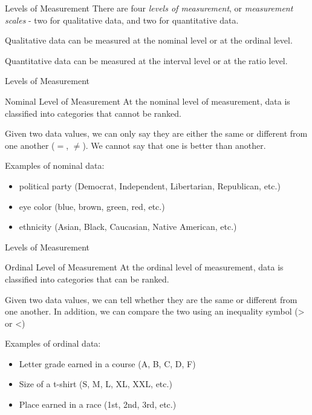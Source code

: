 \documentclass[t]{beamer}
\newcommand{\?}{\stackrel{?}{=}}
\begin{document}
	\begin{frame}{Levels of Measurement}
		There are four \textit{levels of measurement}, or \textit{measurement scales} - two for qualitative data, and two for quantitative data. \pause
		
		Qualitative data can be measured at the nominal level or at the ordinal level. \pause
		
		Quantitative data can be measured at the interval level or at the ratio level.
	\end{frame}

	\begin{frame}{Levels of Measurement}
		\begin{block}{Nominal Level of Measurement}
			At the nominal level of measurement, data is classified into categories that cannot be ranked.
			
			Given two data values, we can only say they are either the same or different from one another ($=$, $\neq$). We cannot say that one is better than another.
		\end{block} \pause
	
		Examples of nominal data: \begin{itemize}
			\item political party (Democrat, Independent, Libertarian, Republican, etc.) \pause
			\item eye color (blue, brown, green, red, etc.) \pause
			\item ethnicity (Asian, Black, Caucasian, Native American, etc.)
		\end{itemize}
	\end{frame}

	\begin{frame}{Levels of Measurement}
		\begin{block}{Ordinal Level of Measurement}
			At the ordinal level of measurement, data is classified into categories that can be ranked.
			
			Given two data values, we can tell whether they are the same or different from one another. In addition, we can compare the two using an inequality symbol (> or <)
		\end{block} \pause
	
		Examples of ordinal data: \begin{itemize}
			\item Letter grade earned in a course (A, B, C, D, F) \pause
			\item Size of a t-shirt (S, M, L, XL, XXL, etc.) \pause
			\item Place earned in a race (1st, 2nd, 3rd, etc.)
		\end{itemize}
	\end{frame}
\end{document}
